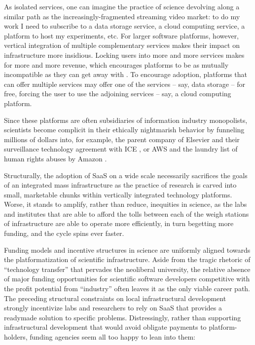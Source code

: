 \documentclass[10pt]{article}
\begin{document}
\begin{multicols}{2}
As isolated services, one can imagine the practice of science devolving
along a similar path as the increasingly-fragmented streaming video
market: to do my work I need to subscribe to a data storage service, a
cloud computing service, a platform to host my experiments, etc. For
larger software platforms, however, vertical integration of multiple
complementary services makes their impact on infrastructure more
insidious. Locking users into more and more services makes for more and
more revenue, which encourages platforms to be as mutually incompatible
as they can get away with \cite{macinnesCompatibilityStandardsMonopoly2005} . To encourage adoption,
platforms that can offer multiple services may offer one of the services
-- say, data storage -- for free, forcing the user to use the adjoining
services -- say, a cloud computing platform.

Since these platforms are often subsidiaries of information industry
monopolists, scientists become complicit in their ethically nightmarish
behavior by funneling millions of dollars into, for example, the parent
company of Elsevier and their surveillance technology agreement with ICE
\cite{biddleLexisNexisProvideGiant2021} , or AWS and the laundry
list of human rights abuses by Amazon \cite{CriticismAmazon2021} .

Structurally, the adoption of SaaS on a wide scale necessarily
sacrifices the goals of an integrated mass infrastructure as the
practice of research is carved into small, marketable chunks within
vertically integrated technology platforms. Worse, it stands to amplify,
rather than reduce, inequities in science, as the labs and institutes
that are able to afford the tolls between each of the weigh stations of
infrastructure are able to operate more efficiently, in turn begetting
more funding, and the cycle spins ever faster.

Funding models and incentive structures in science are uniformly aligned
towards the platformatization of scientific infrastructure. Aside from
the tragic rhetoric of ``technology transfer'' that pervades the
neoliberal university, the relative absence of major funding
opportunities for scientific software developers competitive with the
profit potential from ``industry'' often leaves it as the only viable
career path. The preceding structural constraints on local
infrastructural development strongly incentivize labs and researchers to
rely on SaaS that provides a readymade solution to specific problems.
Distressingly, rather than supporting infrastructural development that
would avoid obligate payments to platform-holders, funding agencies seem
all too happy to lean into them:


\end{multicols}
\end{document}
